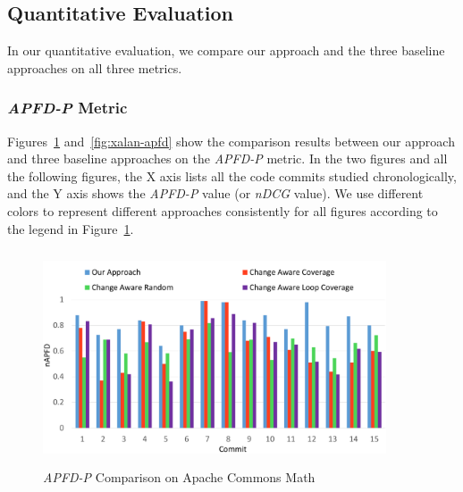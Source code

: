 \subsection{Quantitative Evaluation}
\label{subsec:results}
In our quantitative evaluation, we compare our approach and the three baseline approaches on all three metrics. 

\subsubsection{\textit{APFD-P} Metric}



Figures~\ref{fig:common-math-apfd} and~\ref{fig:xalan-apfd} show the comparison results between our approach and three baseline approaches on the \textit{APFD-P} metric. In the two figures and all the following figures, the X axis lists all the code commits studied chronologically, and the Y axis shows the \textit{APFD-P} value (or \textit{nDCG} value). We use different colors to represent different approaches consistently for all figures according to the legend in Figure~\ref{fig:common-math-apfd}. 

\begin{figure}
		\centering
		\includegraphics[width=4in, height=2.5in]{performance/images/common-math-apfd.pdf}
		
		\caption{\textit{APFD-P} Comparison on Apache Commons Math}	
		\label{fig:common-math-apfd}


\end{figure}

